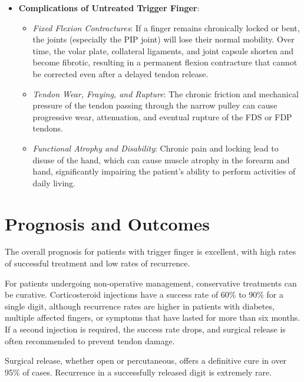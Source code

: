 \begin{itemize}
\begin{itemize}
  \end{itemize}
  \item \textbf{Complications of Untreated Trigger Finger}:
  \begin{itemize}
    \item \textit{Fixed Flexion Contractures}: If a finger remains chronically locked or bent, the joints (especially the PIP joint) will lose their normal mobility. Over time, the volar plate, collateral ligaments, and joint capsule shorten and become fibrotic, resulting in a permanent flexion contracture that cannot be corrected even after a delayed tendon release.
    \item \textit{Tendon Wear, Fraying, and Rupture}: The chronic friction and mechanical pressure of the tendon passing through the narrow pulley can cause progressive wear, attenuation, and eventual rupture of the FDS or FDP tendons.
    \item \textit{Functional Atrophy and Disability}: Chronic pain and locking lead to disuse of the hand, which can cause muscle atrophy in the forearm and hand, significantly impairing the patient's ability to perform activities of daily living.
  \end{itemize}
\end{itemize}

\section*{Prognosis and Outcomes}
The overall prognosis for patients with trigger finger is excellent, with high rates of successful treatment and low rates of recurrence.

For patients undergoing non-operative management, conservative treatments can be curative. Corticosteroid injections have a success rate of 60\% to 90\% for a single digit, although recurrence rates are higher in patients with diabetes, multiple affected fingers, or symptoms that have lasted for more than six months. If a second injection is required, the success rate drops, and surgical release is often recommended to prevent tendon damage.

Surgical release, whether open or percutaneous, offers a definitive cure in over 95\% of cases. Recurrence in a successfully released digit is extremely rare.

